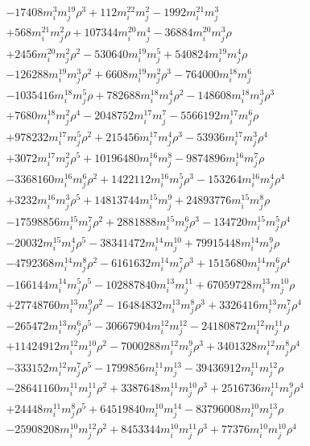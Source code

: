 {\begin{align*}
&-17408m_i^{3}m_j^{19}\rho^{3}+112m_i^{22}m_j^{2}-1992m_i^{21}m_j^{3}\\
&+568m_i^{21}m_j^{2}\rho+107344m_i^{20}m_j^{4}-36884m_i^{20}m_j^{3}\rho\\
&+2456m_i^{20}m_j^{2}\rho^{2}-530640m_i^{19}m_j^{5}+540824m_i^{19}m_j^{4}\rho\\
&-126288m_i^{19}m_j^{3}\rho^{2}+6608m_i^{19}m_j^{2}\rho^{3}-764000m_i^{18}m_j^{6}\\
&-1035416m_i^{18}m_j^{5}\rho+782688m_i^{18}m_j^{4}\rho^{2}-148608m_i^{18}m_j^{3}\rho^{3}\\
&+7680m_i^{18}m_j^{2}\rho^{4}-2048752m_i^{17}m_j^{7}-5566192m_i^{17}m_j^{6}\rho\\
&+978232m_i^{17}m_j^{5}\rho^{2}+215456m_i^{17}m_j^{4}\rho^{3}-53936m_i^{17}m_j^{3}\rho^{4}\\
&+3072m_i^{17}m_j^{2}\rho^{5}+10196480m_i^{16}m_j^{8}-9874896m_i^{16}m_j^{7}\rho\\
&-3368160m_i^{16}m_j^{6}\rho^{2}+1422112m_i^{16}m_j^{5}\rho^{3}-153264m_i^{16}m_j^{4}\rho^{4}\\
&+3232m_i^{16}m_j^{3}\rho^{5}+14813744m_i^{15}m_j^{9}+24893776m_i^{15}m_j^{8}\rho\\
&-17598856m_i^{15}m_j^{7}\rho^{2}+2881888m_i^{15}m_j^{6}\rho^{3}-134720m_i^{15}m_j^{5}\rho^{4}\\
&-20032m_i^{15}m_j^{4}\rho^{5}-38341472m_i^{14}m_j^{10}+79915448m_i^{14}m_j^{9}\rho\\
&-4792368m_i^{14}m_j^{8}\rho^{2}-6161632m_i^{14}m_j^{7}\rho^{3}+1515680m_i^{14}m_j^{6}\rho^{4}\\
&-166144m_i^{14}m_j^{5}\rho^{5}-102887840m_i^{13}m_j^{11}+67059728m_i^{13}m_j^{10}\rho\\
&+27748760m_i^{13}m_j^{9}\rho^{2}-16484832m_i^{13}m_j^{8}\rho^{3}+3326416m_i^{13}m_j^{7}\rho^{4}\\
&-265472m_i^{13}m_j^{6}\rho^{5}-30667904m_i^{12}m_j^{12}-24180872m_i^{12}m_j^{11}\rho\\
&+11424912m_i^{12}m_j^{10}\rho^{2}-7000288m_i^{12}m_j^{9}\rho^{3}+3401328m_i^{12}m_j^{8}\rho^{4}\\
&-333152m_i^{12}m_j^{7}\rho^{5}-1799856m_i^{11}m_j^{13}-39436912m_i^{11}m_j^{12}\rho\\
&-28641160m_i^{11}m_j^{11}\rho^{2}+3387648m_i^{11}m_j^{10}\rho^{3}+2516736m_i^{11}m_j^{9}\rho^{4}\\
&+24448m_i^{11}m_j^{8}\rho^{5}+64519840m_i^{10}m_j^{14}-83796008m_i^{10}m_j^{13}\rho\\
&-25908208m_i^{10}m_j^{12}\rho^{2}+8453344m_i^{10}m_j^{11}\rho^{3}+77376m_i^{10}m_j^{10}\rho^{4}\\

\end{align*}}
